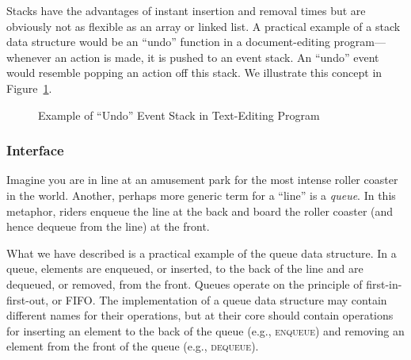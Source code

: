 Stacks have the advantages of instant insertion and removal times but are obviously not as flexible as an array or linked list. A practical example of a stack data structure would be an ``undo'' function in a document-editing program---whenever an action is made, it is pushed to an event stack. An ``undo'' event would resemble popping an action off this stack. We illustrate this concept in Figure~\ref{fig:stackundo}.

\begin{figure}[ht]
\begin{center}
\end{center}
\caption{Example of ``Undo'' Event Stack in Text-Editing Program}
\label{fig:stackundo}
\end{figure}

\subsubsection*{ Interface}
Imagine you are in line at an amusement park for the most intense roller coaster in the world. Another, perhaps more generic term for a ``line'' is a \emph{queue}. In this metaphor, riders enqueue the line at the back and board the roller coaster (and hence dequeue from the line) at the front. 

What we have described is a practical example of the queue data structure. In a queue, elements are enqueued, or inserted, to the back of the line and are dequeued, or removed, from the front. Queues operate on the principle of first-in-first-out, or FIFO. The implementation of a queue data structure may contain different names for their operations, but at their core should contain operations for inserting an element to the back of the queue (e.g., \textsc{enqueue}) and removing an element from the front of the queue (e.g., \textsc{dequeue}). 

